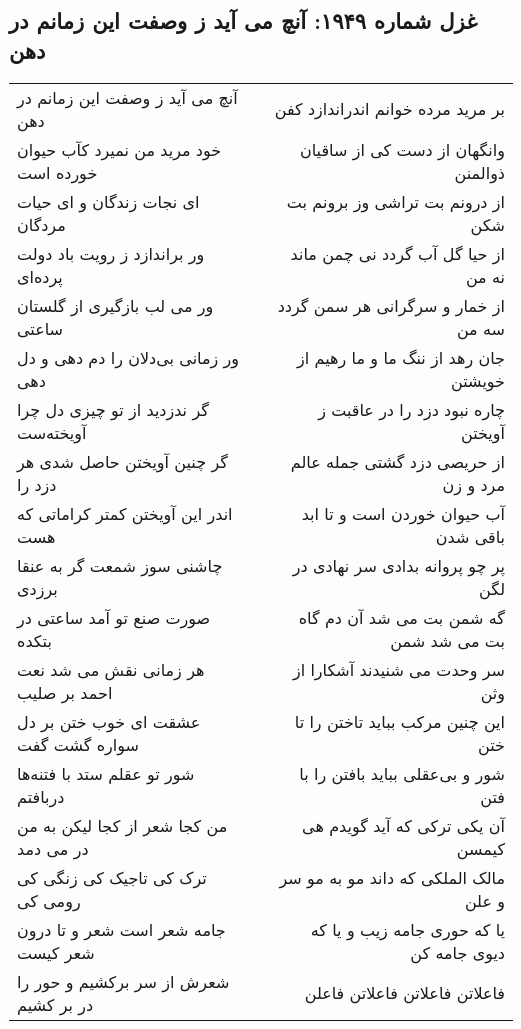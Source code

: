 \begin{center}
\section*{غزل شماره ۱۹۴۹: آنچ می آید ز وصفت این زمانم در دهن}
\label{sec:1949}
\begin{longtable}{l p{0.5cm} r}
آنچ می آید ز وصفت این زمانم در دهن
&&
بر مرید مرده خوانم اندراندازد کفن
\\
خود مرید من نمیرد کآب حیوان خورده است
&&
وانگهان از دست کی از ساقیان ذوالمنن
\\
ای نجات زندگان و ای حیات مردگان
&&
از درونم بت تراشی وز برونم بت شکن
\\
ور براندازد ز رویت باد دولت پرده‌ای
&&
از حیا گل آب گردد نی چمن ماند نه من
\\
ور می لب بازگیری از گلستان ساعتی
&&
از خمار و سرگرانی هر سمن گردد سه من
\\
ور زمانی بی‌دلان را دم دهی و دل دهی
&&
جان رهد از ننگ ما و ما رهیم از خویشتن
\\
گر ندزدید از تو چیزی دل چرا آویخته‌ست
&&
چاره نبود دزد را در عاقبت ز آویختن
\\
گر چنین آویختن حاصل شدی هر دزد را
&&
از حریصی دزد گشتی جمله عالم مرد و زن
\\
اندر این آویختن کمتر کراماتی که هست
&&
آب حیوان خوردن است و تا ابد باقی شدن
\\
چاشنی سوز شمعت گر به عنقا برزدی
&&
پر چو پروانه بدادی سر نهادی در لگن
\\
صورت صنع تو آمد ساعتی در بتکده
&&
گه شمن بت می شد آن دم گاه بت می شد شمن
\\
هر زمانی نقش می شد نعت احمد بر صلیب
&&
سر وحدت می شنیدند آشکارا از وثن
\\
عشقت ای خوب ختن بر دل سواره گشت گفت
&&
این چنین مرکب بباید تاختن را تا ختن
\\
شور تو عقلم ستد با فتنه‌ها دربافتم
&&
شور و بی‌عقلی بباید بافتن را با فتن
\\
من کجا شعر از کجا لیکن به من در می دمد
&&
آن یکی ترکی که آید گویدم هی کیمسن
\\
ترک کی تاجیک کی زنگی کی رومی کی
&&
مالک الملکی که داند مو به مو سر و علن
\\
جامه شعر است شعر و تا درون شعر کیست
&&
یا که حوری جامه زیب و یا که دیوی جامه کن
\\
شعرش از سر برکشیم و حور را در بر کشیم
&&
فاعلاتن فاعلاتن فاعلاتن فاعلن
\\
\end{longtable}
\end{center}
